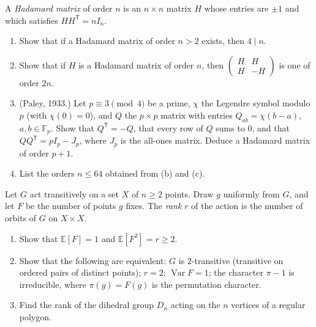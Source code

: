 \begin{exercise}[$\star\star\star$]\label{pb:hadamard}
A \emph{Hadamard matrix} of order $n$ is an $n\times n$ matrix $H$ whose entries are $\pm1$ and which satisfies $HH^{\mathsf T}=nI_n$.
\begin{enumerate}[label=(\alph*)]
\item Show that if a Hadamard matrix of order $n>2$ exists, then $4\mid n$.
\item Show that if $H$ is a Hadamard matrix of order $n$, then $\begin{pmatrix}H&H\\H&-H\end{pmatrix}$ is one of order $2n$.
\item (Paley, 1933.) Let $p\equiv3\pmod4$ be a prime, $\chi$ the Legendre symbol modulo $p$ (with $\chi(0)=0$), and $Q$ the
$p\times p$ matrix with entries $Q_{ab}=\chi(b-a)$, $a,b\in\mathbb F_p$. Show that $Q^{\mathsf T}=-Q$, that every row of $Q$
sums to $0$, and that $QQ^{\mathsf T}=pI_p-J_p$, where $J_p$ is the all-ones matrix. Deduce a Hadamard matrix of order $p+1$.
\item List the orders $n\le64$ obtained from (b) and (c).
\end{enumerate}
\end{exercise}

\begin{exercise}[$\star\star$]\label{pb:rank}
Let $G$ act transitively on a set $X$ of $n\ge2$ points. Draw $g$ uniformly from $G$, and let $F$ be the number of points $g$ fixes. The \emph{rank} $r$ of the action is the number of orbits of $G$ on $X\times X$.
\begin{enumerate}[label=(\alph*)]
\item Show that $\mathbb E[F]=1$ and $\mathbb E[F^2]=r\ge2$.
\item Show that the following are equivalent: $G$ is $2$-transitive (transitive on ordered pairs of distinct points);
$r=2$; $\operatorname{Var}F=1$; the character $\pi-1$ is irreducible, where $\pi(g)=F(g)$ is the permutation character.
\item Find the rank of the dihedral group $D_n$ acting on the $n$ vertices of a regular polygon.
\end{enumerate}
\end{exercise}

